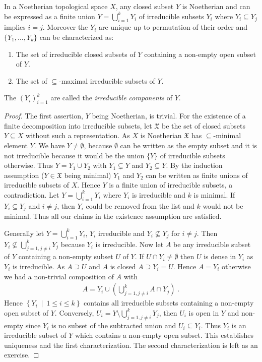 \documentclass[DIV=14,parskip=full,pointednumbers]{scrartcl}
\renewenvironment{itemize}{\begin{enumerate}[label={$\bullet$},ref=\curthm]}{\end{enumerate}}
\theoremstyle{cthm}
\theoremstyle{cvarthm}
\theoremstyle{cdef}
\newcommand{\XX}{\mathfrak{X}}
\newcommand{\st}{\ \middle|\ }
\begin{document}
	\begin{prop}[a.k.a. Proposition 2]
		In a Noetherian topological space $X$, any closed subset $Y$ is Noetherian and can be expressed as a finite union $Y= \bigcup_{i=1}^k Y_i$ of irreducible subsets $Y_i$ where $Y_i\subseteq Y_j$ implies $i=j$. Moreover the $Y_i$ are unique up to permutation of their order and $\{Y_1,\ldots, Y_k\}$ can be characterized as:
		\begin{itemize}
			\item The set of irreducible closed subsets of $Y$ containing a non-empty open subset of $Y$.
			\item The set of $\subseteq$-maximal irreducible subsets of $Y$.
		\end{itemize}
		The $(Y_i)_{i=1}^k$ are called the \emph{irreducible components} of $Y$.
	\end{prop}
	\begin{proof}
		The first assertion, $Y$ being Noetherian, is trivial. For the existence of a finite decomposition into irreducible subsets, let $\XX$ be the set of closed subsets $Y\subseteq X$ without such a representation. As $X$ is Noetherian $\XX$ has $\subseteq $-minimal element $Y$. We have $Y\neq \emptyset$, because $\emptyset$ can be written as the empty subset and it is not irreducible because it would be the union $\{Y\}$ of irreducible subsets otherwise. Thus $Y= Y_1\cup Y_2$ with $Y_1\subsetneq Y$ and $Y_2\subsetneq Y$. By the induction assumption ($Y\in \XX$ being minimal) $Y_1$ and $Y_2$ can be written as finite unions of irreducible subsets of $X$. Hence $Y$ is a finite union of irreducible subsets, a contradiction. Let $Y=\bigcup_{i=1}^k Y_i$ where $Y_i$ is irreducible and $k$ is minimal. If $Y_i\subseteq Y_j$ and $i\neq j$, then $Y_i$ could be removed from the list and $k$ would not be minimal. Thus all our claims in the existence assumption are satisfied.
		
		Generally let $Y=\bigcup_{i=1}^kY_i$, $Y_i$ irreducible and $Y_i\not\subseteq Y_j$ for $i\neq j$. Then $Y_i\not\subseteq \bigcup_{j=1, j\neq i}^k Y_j$ because $Y_i$ is irreducible. Now let $A$ be any irreducible subset of $Y$ containing a non-empty subset $U$ of $Y$. If $U\cap Y_i\neq \emptyset$ then $U$ is dense in $Y_i$ as $Y_i$ is irreducible. As $A\supseteq U$ and $A$ is closed $A\supseteq Y_i = U$. Hence $A=Y_i$ otherwise we had a non-trivial composition of $A$ with 
		\begin{align*}
		A= Y_i \cup \left(\bigcup_{j=1, j\neq i}^k A\cap Y_j\right)\;.
		\end{align*}
		Hence $\left\{ Y_i\st 1\leq i \leq k\right\}$ contains all irreducible subsets containing a non-empty open subset of $Y$. Conversely, $U_i = Y\setminus \bigcup_{j=1, j\neq i}^k Y_j$, then $U_i$ is open in $Y$ and non-empty since $Y_i$ is no subset of the subtracted union and $U_i\subseteq Y_i$. Thus $Y_i$ is an irreducible subset of $Y$ which contains a non-empty open subset. This establishes uniqueness and the first characterization. The second characterization is left as an exercise.
	\end{proof}
	
\end{document}
